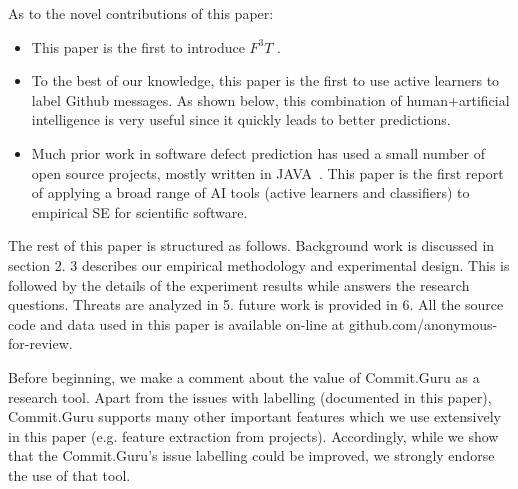 \documentclass[10pt,conference]{IEEEtran}
\newcommand{\bi}{\begin{itemize}[leftmargin=0.4cm]}
\newcommand{\ei}{\end{itemize}}
\begin{document}
As to the novel contributions of this paper:
\bi
\item This paper is the first to introduce $F^3T$ .
\item
To the best of our knowledge,
 this paper  is the first to use active learners  to label  Github messages.
 As shown below, this combination of human+artificial intelligence is very useful since it
 quickly leads to better predictions.
\item
Much prior work in software defect prediction has used a small number of open source projects,
mostly written in JAVA~\cite{Fu2016TuningFS}.
This paper is the first report of applying a broad range of AI tools (active learners and classifiers)
to  empirical SE for scientific software. 
\ei
The rest of this paper is structured as follows. Background work is discussed  in section 2. 3 describes our empirical methodology and experimental design.  This is followed by the details of the experiment results while answers the research questions. Threats are analyzed in 5. future work is provided in 6. All the source code and data used in this paper is available on-line
at github.com/anonymous-for-review. 
  
  Before beginning, we make a comment about the value of Commit.Guru as a research tool. 
 Apart from the issues with  labelling (documented in this paper), Commit.Guru supports
  many other important features which we use extensively in this paper (e.g. feature extraction from projects). 
  Accordingly,
   while we show that the Commit.Guru's issue labelling  could be improved, we strongly endorse the use of that tool.
  
\end{document}
